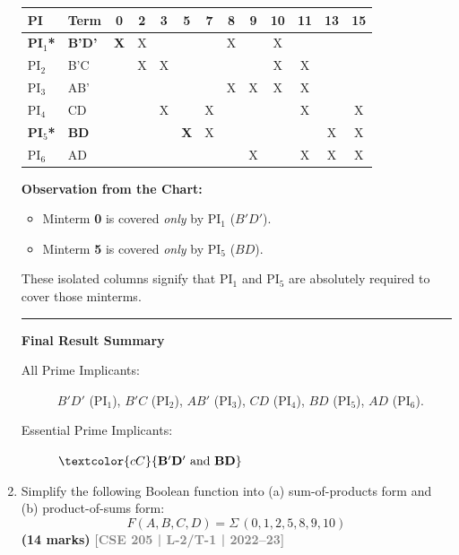 \documentclass[12pt,a3paper]{article}
\newcommand{\yr}[1]{\hfill\textcolor{gray}{\small\textbf{[#1]}}}
\newcommand{\mk}[1]{\textcolor{orange!70!black}{\small\textbf{(#1 marks)}}}
\begin{document}
\begin{enumerate}
\begin{tcolorbox}[enhanced,breakable,ansbox,colback=cC!4,colframe=cC,boxrule=0.8pt,arc=5pt,title={\textbf{Answer}},fonttitle=\bfseries\color{white},colbacktitle=cC]
\begin{center}
\renewcommand{\arraystretch}{1.2}
\begin{tabular}{llccccccccccc}
\toprule
\textbf{PI} & \textbf{Term} & \textbf{0} & \textbf{2} & \textbf{3} & \textbf{5} & \textbf{7} & \textbf{8} & \textbf{9} & \textbf{10} & \textbf{11} & \textbf{13} & \textbf{15} \\
\midrule
\rowcolor{cC!10}
\textbf{PI$_1$*} & \textbf{B'D'} & \textbf{X} & X & & & & X & & X & & & \\
PI$_2$ & B'C & & X & X & & & & & X & X & & \\
PI$_3$ & AB' & & & & & & X & X & X & X & & \\
PI$_4$ & CD & & & X & & X & & & & X & & X \\
\rowcolor{cC!10}
\textbf{PI$_5$*} & \textbf{BD} & & & & \textbf{X} & X & & & & & X & X \\
PI$_6$ & AD & & & & & & & X & & X & X & X \\
\bottomrule
\end{tabular}
\end{center}

\vspace{0.5em}
\textbf{Observation from the Chart:}
\begin{itemize}
    \item Minterm \textbf{0} is covered \textit{only} by PI$_1$ ($B'D'$).
    \item Minterm \textbf{5} is covered \textit{only} by PI$_5$ ($BD$).
\end{itemize}
These isolated columns signify that PI$_1$ and PI$_5$ are absolutely required to cover those minterms. 

\vspace{1em}
\rule{\textwidth}{0.4pt}
\vspace{1em}

\textbf{\large Final Result Summary}

\begin{description}
    \item[All Prime Implicants:] $B'D'$ (PI$_1$), $B'C$ (PI$_2$), $AB'$ (PI$_3$), $CD$ (PI$_4$), $BD$ (PI$_5$), $AD$ (PI$_6$).
    \item[Essential Prime Implicants:] $\textcolor{cC}{\mathbf{B'D'\text{ and }BD}}$
\end{description}

\end{tcolorbox}

\item Simplify the following Boolean function into (a) sum-of-products form and (b) product-of-sums form:
\[ F(A, B, C, D) = \Sigma\,(0, 1, 2, 5, 8, 9, 10) \]
\mk{14} \yr{CSE 205 | L-2/T-1 | 2022--23}


\end{enumerate}
\end{document}
